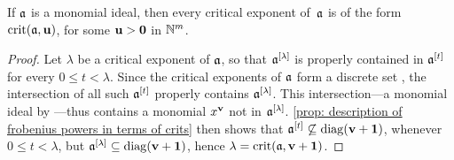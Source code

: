 \documentclass[11pt]{amsart}
\begin{document}
{\begin{corollary}
   \label{cor: every crit is crit wrt diagonal ideal}
   If $\mathfrak{a}$ is a monomial ideal, then every critical exponent of~$\mathfrak{a}$ is of the form $\operatorname{crit}(\mathfrak{a},\mathbf{u})$, for some $\mathbf{u} > \mathbf{0}$ in $\mathbb{N}^m$.
\end{corollary}

\begin{proof}
   Let $\lambda$ be a critical exponent of $\mathfrak{a}$, so that $\mathfrak{a}^{[\lambda]}$ is properly contained in $\mathfrak{a}^{[t]}$ for every $0 \le t <\lambda$.
   Since the critical exponents of $\mathfrak{a}$ form a discrete set \cite[Corollary~5.8]{hernandez+etal.frobenius_powers}, the intersection of all such $\mathfrak{a}^{[t]}$ properly contains $\mathfrak{a}^{[\lambda]}$.
   This intersection---a monomial ideal by ---thus contains a monomial $x^{\mathbf{v}}$ not in $\mathfrak{a}^{[\lambda]}$.
   \cref{prop: description of frobenius powers in terms of crits} then shows that $\mathfrak{a}^{[t]}\not\subseteq \operatorname{diag}(\mathbf{v}+\mathbf{1})$, whenever $0\le t < \lambda$, but $\mathfrak{a}^{[\lambda]} \subseteq \operatorname{diag}(\mathbf{v}+\mathbf{1})$, hence $\lambda = \operatorname{crit}(\mathfrak{a},\mathbf{v}+\mathbf{1})$.
\end{proof}


}








\newpage
\end{document}
